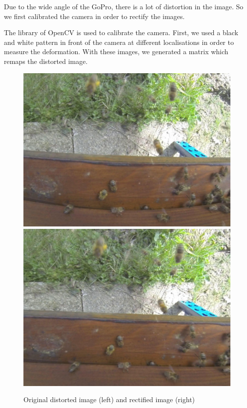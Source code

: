 \documentclass[10pt,twocolumn,letterpaper]{article}
\begin{document}
Due to the wide angle of the GoPro, there is a lot of distortion in the image. So we first calibrated the camera in order to rectify the images.
 
The library of OpenCV \cite{Authors_OpenCV} is used to calibrate the camera. First, we used a black and white pattern in front of the camera at different localisations in order to measure the deformation. With these images, we generated a matrix which remaps the distorted image.

\begin{figure}[h!]
\centering
\includegraphics[scale=0.22]{pictures/Dist.jpg}
\includegraphics[scale=0.22]{pictures/Calib.jpg}
\caption{Original distorted image (left) and rectified image (right)}
\end{figure}
\end{document}

